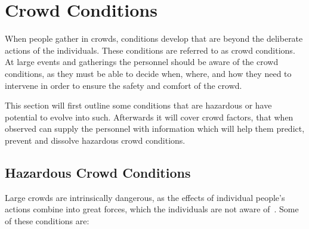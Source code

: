\section{Crowd Conditions}\label{sec:related_work}

When people gather in crowds, conditions develop that are beyond the deliberate actions of the individuals. These conditions are referred to as crowd conditions. At large events and gatherings the personnel should be aware of the crowd conditions, as they must be able to decide when, where, and how they need to intervene in order to ensure the safety and comfort of the crowd.

This section will first outline some conditions that are hazardous or have potential to evolve into such. Afterwards it will cover crowd factors, that when observed can supply the personnel with information which will help them predict, prevent and dissolve hazardous crowd conditions.

\subsection{Hazardous Crowd Conditions}
Large crowds are intrinsically dangerous, as the effects of individual people's actions combine into great forces, which the individuals are not aware of~\cite{website:Wikipedia-Hajj}. Some of these conditions are:

